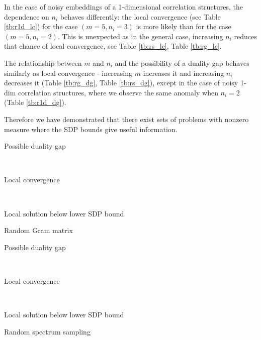 In the case of noisy embeddings of a 1-dimensional correlation structures, the dependence on $n_i$
behaves differently: the local convergence (see Table \ref{tb:r1d_lc}) for the 
case $\left(m=5, n_i=3\right)$ is more likely than for the 
case $\left(m=5, n_i =2\right)$. This is unexpected as in the general case, 
increasing $n_i$ reduces that chance of local convergence, 
see Table \ref{tb:rs_lc}, Table \ref{tb:rg_lc}.

The relationship between $m$ and $n_i$ and the possibility of a
duality gap behaves similarly as local convergence -
increasing $m$ increases it and increasing $n_i$ decreases it (Table \ref{tb:rg_dg}, Table \ref{tb:rs_dg}),
except in the case of noisy 1-dim correlation structures, where
we observe the same anomaly when $n_i = 2$ (Table \ref{tb:r1d_dg}).

Therefore we have demonstrated that there exist sets of problems with nonzero
measure where the SDP bounds give useful information.

\begin{table}[t]
    \begin{subtable}[t]{.5\textwidth}
        \centering
        
        \caption{Possible duality gap}
        \label{tb:rg_dg}
    \end{subtable}
    ~
    \begin{subtable}[t]{.5\textwidth}
        \centering
        
        \caption{Local convergence}
        \label{tb:rg_lc}
    \end{subtable}
    ~
    \begin{subtable}[t]{\textwidth}
        \centering
        
        \caption{Local solution below lower SDP bound}
        \label{tb:rg_lb}
    \end{subtable}
  \caption{Random Gram matrix}
  \label{tb:rg}
\end{table}

\begin{table}[t]
    \begin{subtable}[t]{.5\textwidth}
        \centering
        
        \caption{Possible duality gap}
        \label{tb:rs_dg}
    \end{subtable}
    ~
    \begin{subtable}[t]{.5\textwidth}
        \centering
        
        \caption{Local convergence}
        \label{tb:rs_lc}
    \end{subtable}
    ~
    \begin{subtable}[t]{\textwidth}
        \centering
        
        \caption{Local solution below lower SDP bound}
        \label{tb:rs_lb}
    \end{subtable}
  \caption{Random spectrum sampling}
  \label{tb:rs}
\end{table}


